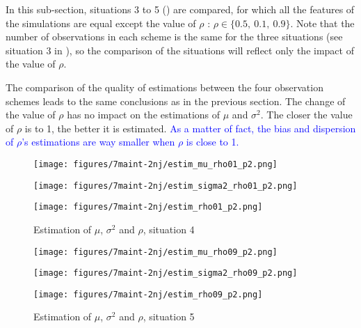 In this sub-section, situations 3 to 5 () are compared, for which all the features of the simulations are equal except the value of $\rho$ : $\rho \in \{0.5,\ 0.1,\ 0.9\}$.
Note that the number of observations in each scheme is the same for the three situations (see situation 3 in ), so the comparison of the situations will reflect only the impact of the value of $\rho$.

The comparison of the quality of estimations between the four observation schemes leads to the same conclusions as in the previous section.
The change of the value of $\rho$ has no impact on the estimations of $\mu$ and $\sigma^2$. The closer the value of $\rho$ is to 1, the better it is estimated. \textcolor{blue}{As a matter of fact, the bias and dispersion of $\rho$'s estimations  are way smaller when $\rho$ is close to 1.}

\begin{figure}[h!]
\begin{multicols}{3}

\texttt{[image: figures/7maint-2nj/estim\_mu\_rho01\_p2.png]}\\
\columnbreak

\texttt{[image: figures/7maint-2nj/estim\_sigma2\_rho01\_p2.png]}  \\
\columnbreak

\texttt{[image: figures/7maint-2nj/estim\_rho01\_p2.png]}  

\end{multicols}
\vspace{-6mm}
\caption{Estimation of $\mu$, $\sigma^2$ and $\rho$, situation 4}
\label{estim3}
\end{figure} 


\begin{figure}[h!]
\begin{multicols}{3}

\texttt{[image: figures/7maint-2nj/estim\_mu\_rho09\_p2.png]} \\
\columnbreak

\texttt{[image: figures/7maint-2nj/estim\_sigma2\_rho09\_p2.png]}  \\
\columnbreak

\texttt{[image: figures/7maint-2nj/estim\_rho09\_p2.png]}  \\
\end{multicols}
\vspace{-6mm}
\caption{Estimation of $\mu$, $\sigma^2$ and $\rho$, situation 5}
\label{estim4}
\end{figure} 


